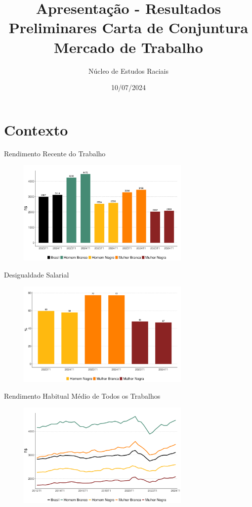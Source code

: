 \documentclass[10pt, xcolor=x11names,compress]{beamer}
\author{Núcleo de Estudos Raciais}
\title{Apresentação - Resultados Preliminares Carta de Conjuntura Mercado de Trabalho}
\institute{Insper}\date{10/07/2024}
\begin{document}
	\begin{frame}
		\titlepage
	\end{frame}
	
	
	\section{Contexto} 
	\begin{frame}{Rendimento Recente do Trabalho}
	\begin{figure}
		\centering
		\includegraphics[width = 0.75\textwidth]{figures_output/rendimento_habitual.pdf}
	\end{figure}
	\end{frame}			
	
	\begin{frame}{Desigualdade Salarial}
	\begin{figure}
		\centering
		\includegraphics[width = 0.75\textwidth]{figures_output/frac_rendimento_habitual.pdf}
	\end{figure}
	\end{frame}			
	
		\begin{frame}{Rendimento Habitual Médio de Todos os Trabalhos}
		\begin{figure}
			\centering
			\includegraphics[width = 0.75\textwidth]{figures_output/rendimento_habitual_br_gen_raca.pdf}
		\end{figure}
	\end{frame}	
	
\end{document}
